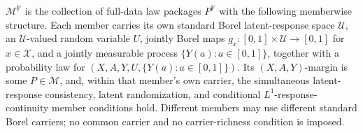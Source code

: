 \(\mathcal M^{\mathrm F}\) is the collection of full-data law packages \(P^{\mathrm F}\) with the following memberwise structure.  Each member carries its own standard Borel latent-response space \(\mathcal U\), an \(\mathcal U\)-valued random variable \(U\), jointly Borel maps \(g_x:[0,1]\times\mathcal U\to[0,1]\) for \(x\in\mathcal X\), and a jointly measurable process \(\{Y(a):a\in[0,1]\}\), together with a probability law for \((X,A,Y,U,\{Y(a):a\in[0,1]\})\).  Its \((X,A,Y)\)-margin is some \(P\in\mathcal M\), and, within that member's own carrier, the simultaneous latent-response consistency, latent randomization, and conditional \(L^1\)-response-continuity member conditions hold.  Different members may use different standard Borel carriers; no common carrier and no carrier-richness condition is imposed.